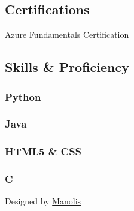 \documentclass[english,]{article}
\begin{document}
\hypertarget{certifications}{%
\subsection{\texorpdfstring{{ \emph{} \emph{} }
Certifications}{    Certifications}}\label{certifications}}

Azure Fundamentals Certification

\hypertarget{skills-proficiency}{%
\subsection{\texorpdfstring{{ \emph{} \emph{} } Skills \&
Proficiency}{    Skills \& Proficiency}}\label{skills-proficiency}}

\hypertarget{python}{%
\subsubsection{Python}\label{python}}

\hypertarget{java}{%
\subsubsection{Java}\label{java}}

\hypertarget{html5-css}{%
\subsubsection{HTML5 \& CSS}\label{html5-css}}

\hypertarget{c}{%
\subsubsection{C}\label{c}}

{Designed by \href{https://github.com/Mnlsvt}{Manolis}}
\end{document}
